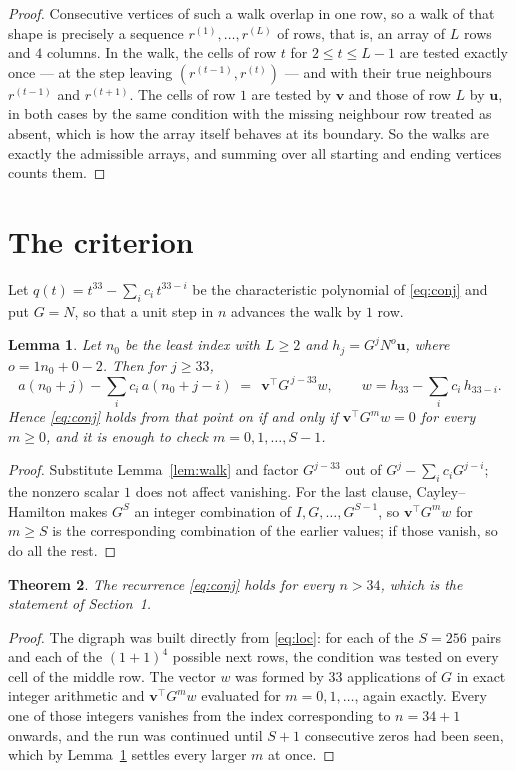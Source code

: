 \documentclass[11pt,a4paper]{article}
\theoremstyle{plain}
\newtheorem{theorem}{Theorem}
\newtheorem{lemma}[theorem]{Lemma}
\theoremstyle{definition}
\begin{document}
\begin{proof}
Consecutive vertices of such a walk overlap in one row, so a walk of that shape is
precisely a sequence $r^{(1)},\dots,r^{(L)}$ of rows, that is, an array of $L$ rows
and $4$ columns. In the walk, the cells of row $t$ for $2\le t\le L-1$ are tested
exactly once --- at the step leaving $(r^{(t-1)},r^{(t)})$ --- and with their true
neighbours $r^{(t-1)}$ and $r^{(t+1)}$. The cells of row $1$ are tested by
$\mathbf{v}$ and those of row $L$ by $\mathbf{u}$, in both cases by the same condition
with the missing neighbour row treated as absent, which is how the array itself behaves at
its boundary. So the walks are exactly the admissible arrays, and summing over all starting
and ending vertices counts them.
\end{proof}

\section{The criterion}

Let $q(t)=t^{33}-\sum_i c_i\,t^{33-i}$ be the characteristic polynomial of
\eqref{eq:conj} and put $G=N$, so that a unit step in $n$ advances the walk by
$1$ row.

\begin{lemma}\label{lem:crit}
Let $n_0$ be the least index with $L\ge2$ and $h_j=G^{j}N^{o}\mathbf{u}$, where
$o=1n_0+0-2$. Then for $j\ge33$,
\[
a(n_0+j)-\sum_i c_i\,a(n_0+j-i)\;=\;\,\mathbf{v}^{\!\top}G^{\,j-33}w,
\qquad w=h_{33}-\sum_i c_i\,h_{33-i} .
\]
Hence \eqref{eq:conj} holds from that point on if and only if
$\mathbf{v}^{\!\top}G^{m}w=0$ for every $m\ge0$, and it is enough to check
$m=0,1,\dots,S-1$.
\end{lemma}

\begin{proof}
Substitute Lemma~\ref{lem:walk} and factor $G^{j-33}$ out of
$G^{j}-\sum_ic_iG^{j-i}$; the nonzero scalar $1$ does not affect
vanishing. For the last clause, Cayley--Hamilton makes $G^{S}$ an integer combination of
$I,G,\dots,G^{S-1}$, so $\mathbf{v}^{\!\top}G^{m}w$ for $m\ge S$ is the corresponding
combination of the earlier values; if those vanish, so do all the rest.
\end{proof}

\begin{theorem}
The recurrence \eqref{eq:conj} holds for every $n>34$, which is the statement of
Section~1.
\end{theorem}

\begin{proof}
The digraph was built directly from \eqref{eq:loc}: for each of the $S=256$ pairs and each
of the $(1+1)^{4}$ possible next rows, the condition was tested on every cell of
the middle row. The vector $w$ was formed by $33$ applications of $G$ in exact integer
arithmetic and $\mathbf{v}^{\!\top}G^{m}w$ evaluated for $m=0,1,\dots$, again exactly.
Every one of those integers vanishes from the index corresponding to $n=34+1$ onwards,
and the run was continued until $S+1$ consecutive zeros had been seen, which by
Lemma~\ref{lem:crit} settles every larger $m$ at once.
\end{proof}
\end{document}
